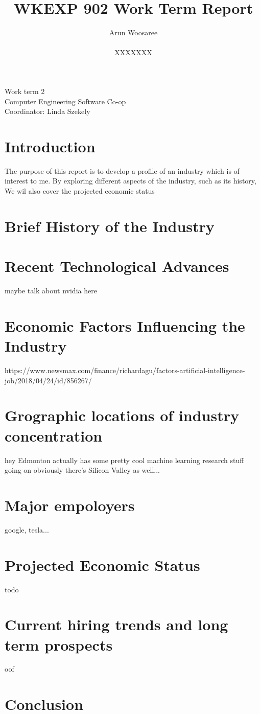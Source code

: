 \documentclass[letterpaper,12pt]{article}
\title{WKEXP 902 Work Term Report}
\author{Arun Woosaree \\ \\ XXXXXXX}
\begin{document}
\relax
\begin{titlepage}
 \maketitle
 \thispagestyle{empty} %
 \centering
 \large
 \vspace{1cm}
 Work term 2\\
 \vspace{1cm}
 Computer Engineering Software Co-op \\
 \vspace{1cm}
 Coordinator: Linda Szekely
\end{titlepage}

\section{Introduction}
The purpose of this report is to develop a profile of an industry which is of interest to me.
By exploring different aspects of the industry, such as its history, 
We wil also cover the projected economic status 

\section{Brief History of the Industry}
\lipsum[1]

\section{Recent Technological Advances}
maybe talk about nvidia here

\section{Economic Factors Influencing the Industry}
https://www.newsmax.com/finance/richardagu/factors-artificial-intelligence-job/2018/04/24/id/856267/

\section{Grographic locations of industry concentration}
hey Edmonton actually has some pretty cool machine learning research stuff
going on
obviously there's Silicon Valley as well...

\section{Major empoloyers}
google, tesla...

\section{Projected Economic Status}
todo \cite{forbesprojected}

\section{Current hiring trends and long term prospects}
oof
\section{Conclusion}
\lipsum[1]


\singlespacing
\nocite{*}
\printbibliography
% 
% 
\end{document}
